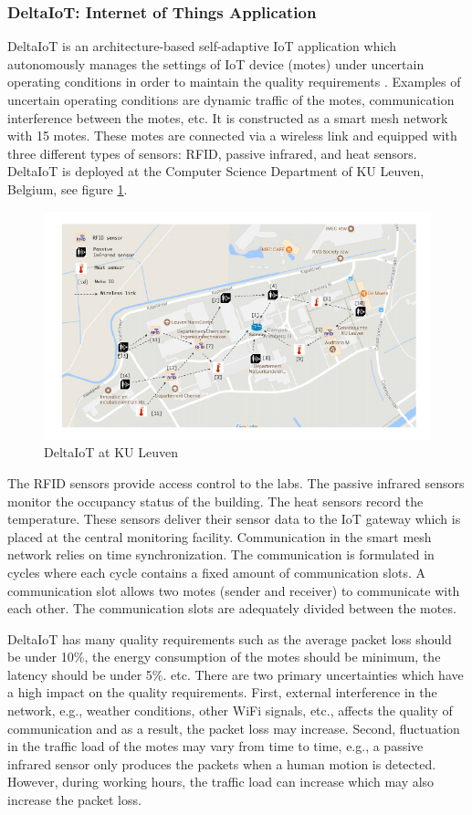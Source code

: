 \documentclass[a4paper,12pt]{article}
\begin{document}
\subsubsection{DeltaIoT: Internet of Things Application}
DeltaIoT is an architecture-based self-adaptive IoT application which autonomously manages the settings of IoT device (motes) under uncertain operating conditions in order to maintain the quality requirements \cite{DELTAIOT-2017}. Examples of uncertain operating conditions are dynamic traffic of the motes, communication interference between the motes, etc. It is constructed as a smart mesh network with 15 motes. These motes are connected via a wireless link and equipped with three different types of sensors: RFID, passive infrared, and heat sensors. DeltaIoT is deployed at the Computer Science Department of KU Leuven, Belgium, see figure \ref{DeltaIoT}.
\begin{figure}[H]
	\centering
	\includegraphics[keepaspectratio, width=\linewidth]{figures/DeltaIoT.pdf}
	\caption{DeltaIoT at KU Leuven}
	\label{DeltaIoT}
\end{figure}
The RFID sensors provide access control to the labs. The passive infrared sensors monitor the occupancy status of the building. The heat sensors record the temperature. These sensors deliver their sensor data to the IoT gateway which is placed at the central monitoring facility. Communication in the smart mesh network relies on time synchronization. The communication is formulated in cycles where each cycle contains a fixed amount of communication slots. A communication slot allows two motes (sender and receiver) to communicate with each other. The communication slots are adequately divided between the motes.

DeltaIoT has many quality requirements such as the average packet loss should be under 10\%, the energy consumption of the motes should be minimum, the latency should be under 5\%. etc. There are two primary uncertainties which have a high impact on the quality requirements. First, external interference in the network, e.g., weather conditions, other WiFi signals, etc., affects the quality of communication and as a result, the packet loss may increase. Second, fluctuation in the traffic load of the motes may vary from time to time, e.g., a passive infrared sensor only produces the packets when a human motion is detected. However, during working hours, the traffic load can increase which may also increase the packet loss.
\end{document}
